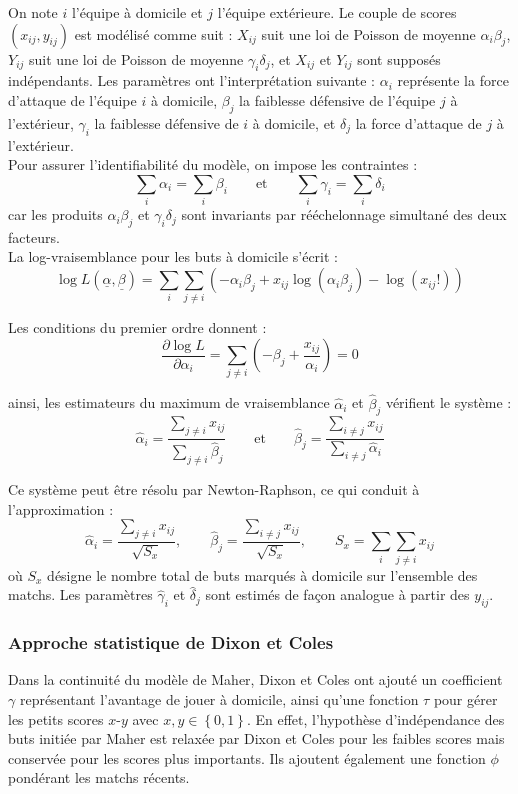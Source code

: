 \noindent On note $i$ l'équipe à domicile et $j$ l'équipe extérieure. Le couple de 
scores $(x_{ij}, y_{ij})$ est modélisé comme suit : $X_{ij}$ suit une loi de Poisson 
de moyenne $\alpha_i \beta_j$, $Y_{ij}$ suit une loi de Poisson de moyenne 
$\gamma_i \delta_j$, et $X_{ij}$ et $Y_{ij}$ sont supposés indépendants. 
Les paramètres ont l'interprétation suivante : $\alpha_i$ représente la force 
d'attaque de l'équipe $i$ à domicile, $\beta_j$ la faiblesse défensive de l'équipe 
$j$ à l'extérieur, $\gamma_i$ la faiblesse défensive de $i$ à domicile, et $\delta_j$ 
la force d'attaque de $j$ à l'extérieur.\\

\noindent Pour assurer l'identifiabilité du modèle, on impose les contraintes :
\[
\sum_i \alpha_i = \sum_i \beta_i \qquad \text{et} \qquad \sum_i \gamma_i = \sum_i \delta_i
\]
car les produits $\alpha_i \beta_j$ et $\gamma_i \delta_j$ sont invariants par 
rééchelonnage simultané des deux facteurs.\\

\noindent La log-vraisemblance pour les buts à domicile s'écrit :
\[
\log L(\underline{\alpha}, \underline{\beta}) = \sum_{i} \sum_{j \neq i} 
\left( -\alpha_i \beta_j + x_{ij} \log(\alpha_i \beta_j) - \log(x_{ij}!) \right)
\]

\noindent Les conditions du premier ordre donnent :
\[
\frac{\partial \log L}{\partial \alpha_i} = \sum_{j \neq i} 
\left( -\beta_j + \frac{x_{ij}}{\alpha_i} \right) = 0
\]

\noindent ainsi, les estimateurs du maximum de vraisemblance $\hat{\alpha}_i$ et $\hat{\beta}_j$ 
vérifient le système :
\[
\hat{\alpha}_i = \frac{\sum_{j \neq i} x_{ij}}{\sum_{j \neq i} \hat{\beta}_j}
\qquad \text{et} \qquad
\hat{\beta}_j = \frac{\sum_{i \neq j} x_{ij}}{\sum_{i \neq j} \hat{\alpha}_i}
\]

\noindent Ce système peut être résolu par Newton-Raphson, ce qui conduit à l'approximation :
\[
\hat{\alpha}_i = \frac{\sum_{j \neq i} x_{ij}}{\sqrt{S_x}}, \qquad
\hat{\beta}_j = \frac{\sum_{i \neq j} x_{ij}}{\sqrt{S_x}}, \qquad
S_x = \sum_i \sum_{j \neq i} x_{ij}
\]
où $S_x$ désigne le nombre total de buts marqués à domicile sur l'ensemble des matchs.
Les paramètres $\hat{\gamma}_i$ et $\hat{\delta}_j$ sont estimés de façon analogue 
à partir des $y_{ij}$.



\subsubsection{Approche statistique de Dixon et Coles}
Dans la continuité du modèle de Maher, Dixon et Coles ont ajouté un coefficient $\gamma$ 
représentant l'avantage de jouer à domicile, ainsi qu'une fonction $\tau$ pour gérer 
les petits scores $x$-$y$ avec $x,y \in \left\{ 0,1 \right\} $. En effet, l'hypothèse 
d'indépendance des buts initiée par Maher est relaxée par Dixon et Coles pour les 
faibles scores mais conservée pour les scores plus importants. Ils ajoutent également 
une fonction $\phi$ pondérant les matchs récents.




